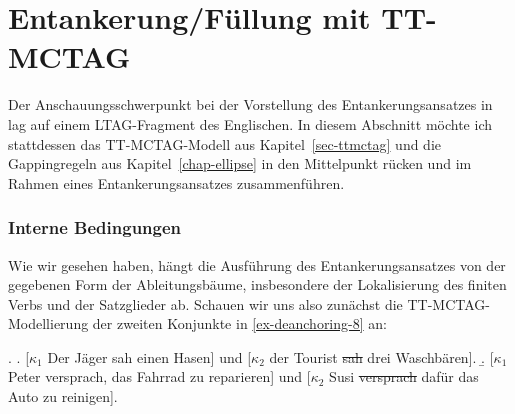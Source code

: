 \section{Entankerung/Füllung mit TT-MCTAG}\label{sec-deanchoring-ttmctag}

Der Anschauungsschwerpunkt bei der Vorstellung des Entankerungsansatzes in \cite{Lichte:Kallmeyer:10} lag auf einem LTAG-Fragment des Englischen. In diesem Abschnitt möchte ich stattdessen das TT-MCTAG-Modell aus Kapitel~\ref{sec-ttmctag} und die Gappingregeln aus Kapitel~\ref{chap-ellipse} in den Mittelpunkt rücken und im Rahmen eines Entankerungsansatzes zusammenführen. 


\subsubsection*{Interne Bedingungen}

Wie wir gesehen haben, hängt die Ausführung des Entankerungsansatzes von der gegebenen Form der Ableitungsbäume, insbesondere der Lokalisierung des finiten Verbs und der Satzglieder ab. Schauen wir uns also zunächst die TT-MCTAG-Modellierung der zweiten Konjunkte in \ref{ex-deanchoring-8} an:

\ex. \label{ex-deanchoring-8}
\a. \label{ex-deanchoring-8-a} [$\kappa_1$ Der Jäger sah einen Hasen] und [$\kappa_2$ der Tourist \sout{sah} drei Waschbären].
\b. \label{ex-deanchoring-8-b} [$\kappa_1$ Peter versprach, das Fahrrad zu reparieren] und [$\kappa_2$ Susi \sout{versprach} dafür das Auto zu reinigen].

